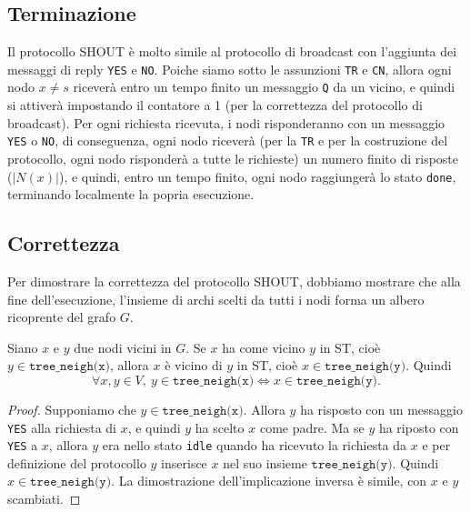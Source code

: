 \subsection{Terminazione}
Il protocollo SHOUT è molto simile al protocollo di broadcast con l'aggiunta dei messaggi di reply \texttt{YES} e \texttt{NO}. Poiche siamo sotto le assunzioni \texttt{TR} e \texttt{CN}, allora ogni nodo $x \neq s$ riceverà entro un tempo finito un messaggio \texttt{Q} da un vicino, e quindi si attiverà impostando il contatore a 1 (per la correttezza del protocollo di broadcast). Per ogni richiesta ricevuta, i nodi risponderanno con un messaggio \texttt{YES} o \texttt{NO}, di conseguenza, ogni nodo riceverà (per la \texttt{TR} e per la costruzione del protocollo, ogni nodo risponderà a tutte le richieste) un numero finito di risposte ($|N(x)|$), e quindi, entro un tempo finito, ogni nodo raggiungerà lo stato \texttt{done}, terminando localmente la popria esecuzione.

\subsection{Correttezza}

Per dimostrare la correttezza del protocollo SHOUT, dobbiamo mostrare che alla fine dell'esecuzione, l'insieme di archi scelti da tutti i nodi forma un albero ricoprente del grafo $G$.

\begin{lemma}[Coerenza]\label{lemma:coerenza}
    Siano $x$ e $y$ due nodi vicini in $G$. Se $x$ ha come vicino $y$ in ST, cioè $y \in \texttt{tree\_neigh(x)}$, allora $x$ è vicino di $y$ in ST, cioè $x \in \texttt{tree\_neigh(y)}$. Quindi 
    \[
        \forall x, y \in V,\ y \in \texttt{tree\_neigh(x)} \iff x \in \texttt{tree\_neigh(y)}.
    \]
    \begin{proof}
        Supponiamo che $y \in \texttt{tree\_neigh(x)}$. Allora $y$ ha risposto con un messaggio \texttt{YES} alla richiesta di $x$, e quindi $y$ ha scelto $x$ come padre. Ma se $y$ ha riposto con \texttt{YES} a $x$, allora $y$ era nello stato \texttt{idle} quando ha ricevuto la richiesta da $x$ e per definizione del protocollo $y$ inserisce $x$ nel suo insieme $\texttt{tree\_neigh(y)}$. Quindi $x \in \texttt{tree\_neigh(y)}$. La dimostrazione dell'implicazione inversa è simile, con $x$ e $y$ scambiati.
    \end{proof} 
\end{lemma}

